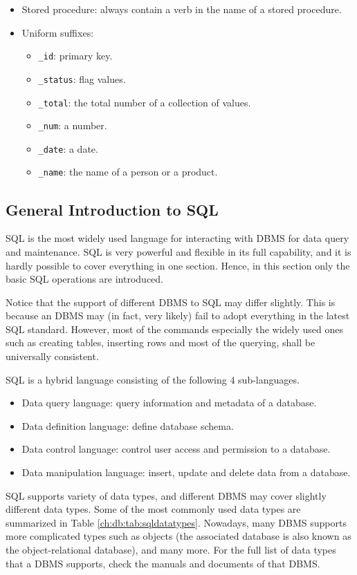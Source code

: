 \begin{itemize}
\begin{itemize}
\end{itemize}
\item Stored procedure: always contain a verb in the name of a stored procedure.
\item Uniform suffixes:
\begin{itemize}
	\item \verb|_id|: primary key.
	\item \verb|_status|: flag values.
	\item \verb|_total|: the total number of a collection of values.
	\item \verb|_num|: a number.
	\item \verb|_date|: a date.
	\item \verb|_name|: the name of a person or a product.
\end{itemize}
\end{itemize}

\subsection{General Introduction to SQL}

SQL is the most widely used language for interacting with DBMS for data query and maintenance. SQL is very powerful and flexible in its full capability, and it is hardly possible to cover everything in one section. Hence, in this section only the basic SQL operations are introduced.

Notice that the support of different DBMS to SQL may differ slightly. This is because an DBMS may (in fact, very likely) fail to adopt everything in the latest SQL standard. However, most of the commands especially the widely used ones such as creating tables, inserting rows and most of the querying, shall be universally consistent.

SQL is a hybrid language consisting of the following 4 sub-languages.
\begin{itemize}
  \item Data query language: query information and metadata of a database.
  \item Data definition language: define database schema.
  \item Data control language: control user access and permission to a database.
  \item Data manipulation language: insert, update and delete data from a database.
\end{itemize}

SQL supports variety of data types, and different DBMS may cover slightly different data types. Some of the most commonly used data types are summarized in Table \ref{ch:db:tab:sqldatatypes}. Nowadays, many DBMS supports more complicated types such as objects (the associated database is also known as the object-relational database), and many more. For the full list of data types that a DBMS supports, check the manuals and documents of that DBMS.

